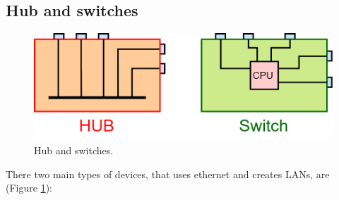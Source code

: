 \subsection{Hub and switches}
\begin{figure}[H]
\centering
\includegraphics[scale=0.3]{Images/Layer2/hub_vs_switch}
\caption{\footnotesize{Hub and switches.}}\label{hub_vs_switch}
\end{figure}
There two main types of devices, that uses ethernet and creates LANs, are (Figure \ref{hub_vs_switch}):
